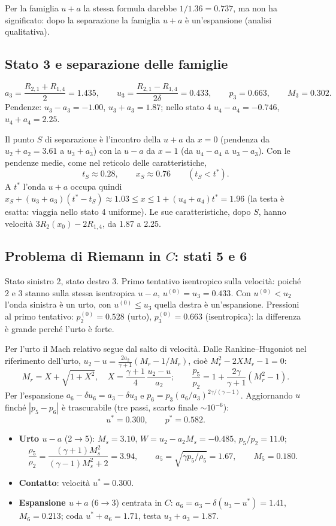 \documentclass[11pt,a4paper]{article}
\newcommand{\uma}{u-a}
\newcommand{\upa}{u+a}
\newcommand{\Mr}{M_{r}}
\newcommand{\Ms}{M_{s}}
\begin{document}
Per la famiglia $\upa$ la stessa formula darebbe $1/\num{1.36}=\num{0.737}$, ma non ha significato: dopo la
separazione la famiglia $\upa$ è un'espansione (analisi qualitativa).

\subsection*{Stato 3 e separazione delle famiglie}
\[
a_3=\frac{R_{2,1}+R_{1,4}}{2}=\num{1.435},\qquad u_3=\frac{R_{2,1}-R_{1,4}}{2\delta}=\num{0.433},\qquad
p_3=\num{0.663},\qquad M_3=\num{0.302}.
\]
Pendenze: $u_3-a_3=-\num{1.00}$, $u_3+a_3=\num{1.87}$; nello stato 4 $u_4-a_4=-\num{0.746}$,
$u_4+a_4=\num{2.25}$.

Il punto $S$ di separazione è l'incontro della $\upa$ da $x=0$ (pendenza da $u_2+a_2=\num{3.61}$ a
$u_3+a_3$) con la $\uma$ da $x=1$ (da $u_4-a_4$ a $u_3-a_3$). Con le pendenze medie, come nel reticolo delle
caratteristiche,
\[
t_S\approx\num{0.28},\qquad x_S\approx\num{0.76}\qquad(t_S<t^*).
\]
A $t^*$ l'onda $\upa$ occupa quindi $x_S+(u_3+a_3)(t^*-t_S)\approx\num{1.03}\le x\le 1+(u_4+a_4)t^*=\num{1.96}$
(la testa è esatta: viaggia nello stato 4 uniforme). Le sue caratteristiche, dopo $S$, hanno velocità
$3R_2(x_0)-2R_{1,4}$, da \num{1.87} a \num{2.25}.

\subsection*{Problema di Riemann in $C$: stati 5 e 6}
Stato sinistro 2, stato destro 3. Primo tentativo isentropico sulla velocità: poiché 2 e 3 stanno sulla stessa
isentropica $\uma$, $u^{(0)}=u_3=\num{0.433}$. Con $u^{(0)}<u_2$ l'onda sinistra è un urto, con
$u^{(0)}\le u_3$ quella destra è un'espansione. Pressioni al primo tentativo: $p_2^{(0)}=\num{0.528}$ (urto),
$p_3^{(0)}=\num{0.663}$ (isentropica): la differenza è grande perché l'urto è forte.

Per l'urto il Mach relativo segue dal salto di velocità. Dalle Rankine--Hugoniot nel riferimento dell'urto,
$u_2-u=\tfrac{2a_2}{\gamma+1}\left(\Mr-1/\Mr\right)$, cioè $\Mr^2-2X\Mr-1=0$:
\[
\Mr=X+\sqrt{1+X^2},\quad X=\frac{\gamma+1}{4}\,\frac{u_2-u}{a_2};\qquad
\frac{p_5}{p_2}=1+\frac{2\gamma}{\gamma+1}\left(\Mr^2-1\right).
\]
Per l'espansione $a_6-\delta u_6=a_3-\delta u_3$ e $p_6=p_3(a_6/a_3)^{2\gamma/(\gamma-1)}$. Aggiornando $u$
finché $|p_5-p_6|$ è trascurabile (tre passi, scarto finale $\sim10^{-6}$):
\[
u^*=\num{0.300},\qquad p^*=\num{0.582}.
\]
\begin{itemize}
\item \textbf{Urto $\uma$} (2$\to$5): $\Ms=\num{3.10}$, $W=u_2-a_2\Ms=-\num{0.485}$,
  $p_5/p_2=\num{11.0}$;
  \[
  \frac{\rho_5}{\rho_2}=\frac{(\gamma+1)\Ms^2}{(\gamma-1)\Ms^2+2}=\num{3.94},\qquad
  a_5=\sqrt{\gamma p_5/\rho_5}=\num{1.67},\qquad M_5=\num{0.180}.
  \]
\item \textbf{Contatto}: velocità $u^*=\num{0.300}$.
\item \textbf{Espansione $\upa$} (6$\to$3) centrata in $C$: $a_6=a_3-\delta(u_3-u^*)=\num{1.41}$,
  $M_6=\num{0.213}$; coda $u^*+a_6=\num{1.71}$, testa $u_3+a_3=\num{1.87}$.
\end{itemize}
\end{document}
